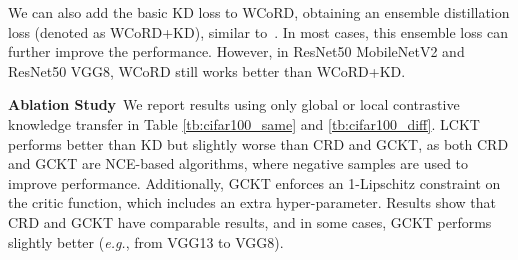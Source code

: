 \documentclass[final]{cvpr}
\theoremstyle{definition}
\begin{document}
We can also add the basic KD loss to WCoRD, obtaining an ensemble distillation loss (denoted as WCoRD+KD), similar to~\cite{tian2019contrastive}. In most cases, this ensemble loss can further improve the performance. However, in ResNet50  MobileNetV2 and ResNet50  VGG8, WCoRD still works better than WCoRD+KD.

\vspace{5pt}
\noindent\textbf{Ablation Study}\,
We report results using only global or local contrastive knowledge transfer in Table \ref{tb:cifar100_same} and \ref{tb:cifar100_diff}. 
LCKT performs better than KD but slightly worse than CRD and GCKT, as both
CRD and GCKT are NCE-based algorithms, where negative samples are used to improve performance.
Additionally, GCKT enforces an 1-Lipschitz constraint on the critic function, which includes an extra hyper-parameter. 
Results show that CRD and GCKT have comparable results, and
in some cases, GCKT performs slightly better (\emph{e.g.}, from VGG13 to VGG8).
\end{document}
